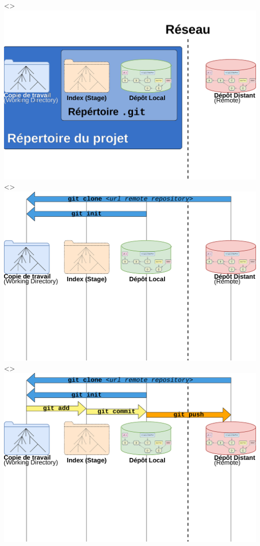 \documentclass[table,tikz,12pt,svgnames]{beamer}
\begin{document}
\begin{frame}
\begin{adjustwidth}{-0.75cm}{0cm}{}
\begin{center}
		\fi
		\only<\value{numSlide}>{{\includegraphics[scale=0.44]{images/workflow4.pdf}}}
		\ifANIMATE
			\only<\value{numSlide}>{{\includegraphics[scale=0.44]{images/workflow5.pdf}}}
			\only<\value{numSlide}>{{\includegraphics[scale=0.44]{images/workflow6.pdf}}}

\end{center}
\end{adjustwidth}
\end{frame}
\end{document}
